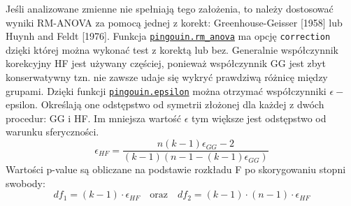 \documentclass[polish,]{book}
\begin{document}
Jeśli analizowane zmienne nie spełniają tego założenia, to należy dostosować wyniki RM-ANOVA za pomocą jednej z korekt: Greenhouse-Geisser {[}1958{]} lub Huynh and
Feldt {[}1976{]}. Funkcja \href{https://pingouin-stats.org/generated/pingouin.rm_anova.html\#pingouin.rm_anova}{\texttt{pingouin.rm\_anova}} ma opcję \texttt{correction} dzięki której można wykonać test z korektą lub bez. Generalnie współczynnik korekcyjny HF jest używany częściej, ponieważ współczynnik GG jest zbyt konserwatywny tzn. nie zawsze udaje się wykryć prawdziwą różnicę między grupami.
Dzięki funkcji \href{https://pingouin-stats.org/generated/pingouin.epsilon.html\#pingouin.epsilon}{\texttt{pingouin.epsilon}} można otrzymać współczynniki \(\epsilon-\)epsilon. Określają one odstępstwo od symetrii
złożonej dla każdej z dwóch procedur: GG i HF. Im mniejsza wartość \(\epsilon\) tym większe
jest odstępstwo od warunku sferyczności.
\begin{equation}
\epsilon_{HF} = \frac{n(k-1)\epsilon_{GG}-2}{(k-1)(n-1-(k-1)\epsilon_{GG})}
\label{eq:dep03}
\end{equation}
Wartości p-value są obliczane na podstawie rozkładu F po skorygowaniu stopni swobody:
\begin{equation}
df_1=(k-1)\cdot \epsilon_{HF} \quad\mbox{oraz}\quad df_2=(k-1)\cdot (n-1)\cdot \epsilon_{HF}
\label{eq:dep04}
\end{equation}
\end{document}
